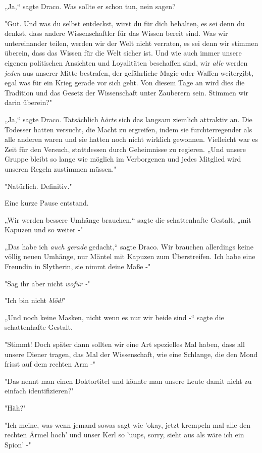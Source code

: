 {„Ja,“ sagte Draco. Was sollte er schon tun, nein sagen?

"Gut. Und was du selbst entdeckst, wirst du für dich behalten, es sei denn du denkst, dass andere Wissenschaftler für das Wissen bereit sind. Was wir untereinander teilen, werden wir der Welt nicht verraten, es sei denn wir stimmen überein, dass das Wissen für die Welt sicher ist. Und wie auch immer unsere eigenen politischen Ansichten und Loyalitäten beschaffen sind, wir \emph{alle} werden \emph{jeden} aus unserer Mitte bestrafen, der gefährliche Magie oder Waffen weitergibt, egal was für ein Krieg gerade vor sich geht. Von diesem Tage an wird dies die Tradition und das Gesetz der Wissenschaft unter Zauberern sein. Stimmen wir darin überein?"

„Ja,“ sagte Draco. Tatsächlich \emph{hörte} sich das langsam ziemlich attraktiv an. Die Todesser hatten versucht, die Macht zu ergreifen, indem sie furchterregender als alle anderen waren und sie hatten noch nicht wirklich gewonnen. Vielleicht war es Zeit für den Versuch, stattdessen durch Geheimnisse zu regieren. „Und unsere Gruppe bleibt so lange wie möglich im Verborgenen und jedes Mitglied wird unseren Regeln zustimmen müssen."

"Natürlich. Definitiv."

Eine kurze Pause entstand.

„Wir werden bessere Umhänge brauchen,“ sagte die schattenhafte Gestalt, „mit Kapuzen und so weiter -"

„Das habe ich \emph{auch gerade} gedacht,“ sagte Draco. Wir brauchen allerdings keine völlig neuen Umhänge, nur Mäntel mit Kapuzen zum Überstreifen. Ich habe eine Freundin in Slytherin, sie nimmt deine Maße -"

"Sag ihr aber nicht \emph{wofür -}"

"Ich bin nicht \emph{blöd!}"

„Und noch keine Masken, nicht wenn es nur wir beide sind -“ sagte die schattenhafte Gestalt.

"Stimmt! Doch später dann sollten wir eine Art spezielles Mal haben, dass all unsere Diener tragen, das Mal der Wissenschaft, wie eine Schlange, die den Mond frisst auf dem rechten Arm -"

"Das nennt man einen Doktortitel und könnte man unsere Leute damit nicht zu einfach identifizieren?"

"Häh?"

"Ich meine, was wenn jemand sowas sagt wie 'okay, jetzt krempeln mal alle den rechten Ärmel hoch' und unser Kerl so 'uups, sorry, sieht aus als wäre ich ein Spion' -"

}
